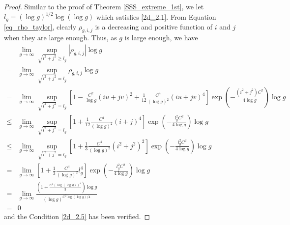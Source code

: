 \documentclass{article}
\begin{document}
\begin{appendices}
\begin{proof}
		Similar to the proof of Theorem \ref{SSS_extreme_1st}, we let $l_g=(\log g)^{1/2}\log(\log g)$ which satisfies \ref{2d_2.1}. From Equation \ref{eq_rho_taylor}, clearly $\rho_{g,i,j}$ is a decreasing and positive function of $i$ and $j$ when they are large enough. Thus, as $g$ is large enough, we have
		\begin{equation*}
			\begin{aligned}
				&\lim_{g \to \infty} \sup_{\sqrt{i^2+j^2} \geq l_g} |\rho_{g,i,j}| \log g\\
				=&\lim_{g \to \infty} \sup_{\sqrt{i^2+j^2} = l_g}\rho_{g,i,j}\log g\\
				=&\lim_{g \to \infty}\sup_{\sqrt{i^2+j^2} = l_g}[1-\frac{C^2}{\log g}(iu+jv)^2+\frac{1}{12}\frac{C^4}{(\log g)^2}(iu+jv)^4]\exp(-\frac{(i^2+j^2)C^2}{4\log g})\log g\\
				\leq&\lim_{g \to \infty}\sup_{\sqrt{i^2+j^2} = l_g}[1+\frac{1}{12}\frac{C^4}{(\log g)^2}(i+j)^4]\exp(-\frac{l_g^2C^2}{4\log g})\log g\\
				\leq&\lim_{g \to \infty}\sup_{\sqrt{i^2+j^2} = l_g}[1+\frac{1}{3}\frac{C^4}{(\log g)^2}(i^2+j^2)^2]\exp(-\frac{l_g^2C^2}{4\log g})\log g\\
				=&\lim_{g \to \infty}[1+\frac{1}{3}\frac{C^4}{(\log g)^2}l_g^4]\exp(-\frac{l_g^2C^2}{4\log g})\log g\\
				=&\lim_{g \to \infty}\frac{\left(1+\frac{C^4(\log(\log g))^4}{3}\right)\log g}{(\log g)^{C^2\log(\log g)/4}}\\
				=&0
			\end{aligned} 
		\end{equation*}
		and the Condition \ref{2d_2.5} has been verified.
		

\end{proof}
\end{appendices}
\end{document}
